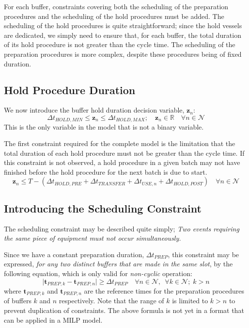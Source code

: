 For each buffer, constraints covering both the scheduling of the preparation
procedures and the scheduling of the hold procedures must be added.
The scheduling of the hold procedures is quite straightforward; since the hold
vessels are dedicated, we simply need to ensure that, for each buffer, the
total duration of its hold procedure is not greater than the cycle time.
The scheduling of the preparation procedures is more complex, despite these
procedures being of fixed duration.

\subsection{Hold Procedure Duration}\label{SS.constr5}

We now introduce the buffer hold duration decision variable, 
$\boldsymbol{z}_{n}$:
\begin{equation}
    \Delta t_{\mathit{HOLD,MIN}} \le \boldsymbol{z}_{n} \le 
    \Delta t_{\mathit{HOLD,MAX}}; \quad
    \boldsymbol{z}_{n} \in \mathbb{R} \quad \forall n \in \mathcal{N}
    \label{eq.z}
\end{equation}
This is the only variable in the model that is not a binary variable.

The first constraint required for the complete model is the limitation that the
total duration of each hold procedure must not be greater than the cycle time.
If this constraint is not observed, a hold procedure in a given batch may not
have finished before the hold procedure for the next batch is due to start.
\begin{equation}
    \boldsymbol{z}_{n} \le T - \left( \Delta t_{\mathit{HOLD,PRE}} +
    \Delta t_{\mathit{TRANSFER}} + \Delta t_{\mathit{USE},n} + \Delta
    t_{\mathit{HOLD,POST}} \right) \quad \forall n \in \mathcal{N}
    \label{eq.z1}
\end{equation}

\subsection{Introducing the Scheduling Constraint}\label{SS.schedintro}

The scheduling constraint may be described quite simply;
\emph{Two events requiring the same piece of equipment must not occur
simultaneously.}

Since we have a constant preparation duration, 
$\Delta t_{\mathit{PREP}}$, this constraint may be expressed, 
\emph{for any two distinct buffers that are made in the same slot}, by the
following equation, which is only valid for \emph{non-cyclic} operation:
\begin{equation}
    \lvert \boldsymbol{t}_{\mathit{PREP},k} - \boldsymbol{t}_{\mathit{PREP},n}
    \rvert \ge \Delta t_{\mathit{PREP}} \quad \forall n \in \mathcal{N},
    \enspace \forall k \in \mathcal{N}; \; k > n
\end{equation}
\noindent where $\boldsymbol{t}_{\mathit{PREP},k}$ and
$\boldsymbol{t}_{\mathit{PREP},n}$ are the reference times for the preparation
procedures of buffers $k$ and $n$ respectively.
Note that the range of $ k $ is limited to $ k > n $ to prevent duplication
of constraints.
The above formula is not yet in a format that can be applied in a MILP model.

